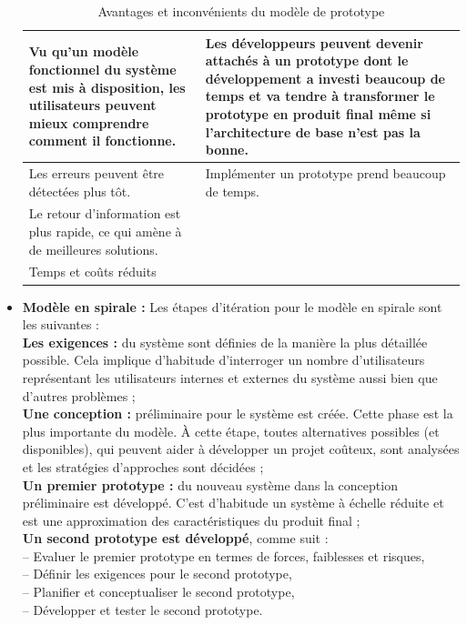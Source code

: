 \documentclass[a4paper, 12pt]{report}
\begin{document}
\begin{itemize}
\begin{table}[H]
\begin{tabular}{|p{6cm}|p{6cm}|}
\hline
\raggedright Vu qu'un modèle fonctionnel du système est mis à disposition, les utilisateurs peuvent mieux comprendre comment il fonctionne.   & Les développeurs peuvent devenir attachés à un prototype dont le développement a investi beaucoup de temps et va tendre à transformer le prototype en produit final même si l'architecture de base n'est pas la bonne.  \tabularnewline
\hline
\raggedright Les erreurs peuvent être détectées plus tôt. & Implémenter un prototype prend beaucoup de temps. \tabularnewline
\hline
\raggedright Le retour d'information est plus rapide, ce qui amène à de meilleures solutions. & \tabularnewline
\hline
\raggedright Temps et coûts réduits & \tabularnewline
\hline
\end{tabular}
\caption{Avantages et inconvénients du modèle de prototype}
\end{table}

\item \textbf{Modèle en spirale :}
Les étapes d'itération pour le modèle en spirale sont les suivantes : \\
\textbf{Les exigences :} du système sont définies de la manière la plus détaillée possible. Cela implique d'habitude d'interroger un nombre d'utilisateurs représentant les utilisateurs internes et externes du système aussi bien que d'autres problèmes ;\\ 
\textbf{Une conception :} préliminaire pour le système est créée. Cette phase est la plus importante du modèle. À cette étape, toutes alternatives possibles (et disponibles), qui peuvent aider à développer un projet coûteux, sont analysées et les stratégies d'approches sont décidées ; \\
\textbf{Un premier prototype :} du nouveau système dans la conception préliminaire est développé. C'est d'habitude un système à échelle réduite et est une approximation des caractéristiques du produit final ;\\ 
\textbf{Un second prototype est développé}, comme suit :\\
    -- Evaluer le premier prototype en termes de forces, faiblesses et risques,\\
    -- Définir les exigences pour le second prototype, \\
    -- Planifier et conceptualiser le second prototype, \\
    -- Développer et tester le second prototype. \\
\end{itemize} 
\end{document}
